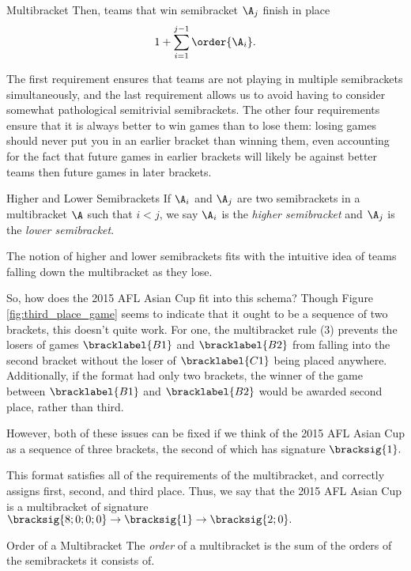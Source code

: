 {\begin{definition}{Multibracket}{}
        Then, teams that win semibracket $\A_j$ finish in place $$1 + \sum_{i=1}^{j-1} \order{\A_i}.$$
    \end{definition}

    The first requirement ensures that teams are not playing in multiple semibrackets simultaneously, and the last requirement allows us to avoid having to consider somewhat pathological semitrivial semibrackets. The other four requirements ensure that it is always better to win games than to lose them: losing games should never put you in an earlier bracket than winning them, even accounting for the fact that future games in earlier brackets will likely be against better teams then future games in later brackets.

    \begin{definition}{Higher and Lower Semibrackets}{}
        If $\A_i$ and $\A_j$ are two semibrackets in a multibracket $\A$ such that $i < j$, we say $\A_i$ is the \textit{higher semibracket} and $\A_j$ is the \textit{lower semibracket}.
    \end{definition}

    The notion of higher and lower semibrackets fits with the intuitive idea of teams falling down the multibracket as they lose.

    So, how does the 2015 AFL Asian Cup fit into this schema? Though Figure \ref{fig:third_place_game} seems to indicate that it ought to be a sequence of two brackets, this doesn't quite work. For one, the multibracket rule (3) prevents the losers of games $\bracklabel{B1}$ and $\bracklabel{B2}$ from falling into the second bracket without the loser of $\bracklabel{C1}$ being placed anywhere. Additionally, if the format had only two brackets, the winner of the game between $\bracklabel{B1}$ and $\bracklabel{B2}$ would be awarded second place, rather than third.

    However, both of these issues can be fixed if we think of the 2015 AFL Asian Cup as a sequence of three brackets, the second of which has signature $\bracksig{1}.$


    This format satisfies all of the requirements of the multibracket, and correctly assigns first, second, and third place. Thus, we say that the 2015 AFL Asian Cup is a multibracket of signature $\bracksig{8;0;0;0} \to \bracksig{1} \to \bracksig{2;0}.$ 

    \begin{definition}{Order of a Multibracket}{}
        The \textit{order} of a multibracket is the sum of the orders of the semibrackets it consists of.
    \end{definition}

}
